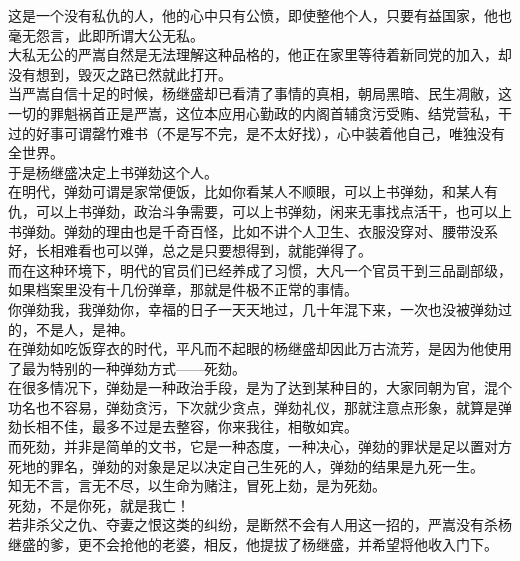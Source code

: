 \begin{multicols}{\theparacolNo}
这是一个没有私仇的人，他的心中只有公愤，即使整他个人，只要有益国家，他也毫无怨言，此即所谓大公无私。\\

大私无公的严嵩自然是无法理解这种品格的，他正在家里等待着新同党的加入，却没有想到，毁灭之路已然就此打开。\\

当严嵩自信十足的时候，杨继盛却已看清了事情的真相，朝局黑暗、民生凋敝，这一切的罪魁祸首正是严嵩，这位本应用心勤政的内阁首辅贪污受贿、结党营私，干过的好事可谓罄竹难书（不是写不完，是不太好找），心中装着他自己，唯独没有全世界。\\

于是杨继盛决定上书弹劾这个人。\\

在明代，弹劾可谓是家常便饭，比如你看某人不顺眼，可以上书弹劾，和某人有仇，可以上书弹劾，政治斗争需要，可以上书弹劾，闲来无事找点活干，也可以上书弹劾。弹劾的理由也是千奇百怪，比如不讲个人卫生、衣服没穿对、腰带没系好，长相难看也可以弹，总之是只要想得到，就能弹得了。\\

而在这种环境下，明代的官员们已经养成了习惯，大凡一个官员干到三品副部级，如果档案里没有十几份弹章，那就是件极不正常的事情。\\

你弹劾我，我弹劾你，幸福的日子一天天地过，几十年混下来，一次也没被弹劾过的，不是人，是神。\\

在弹劾如吃饭穿衣的时代，平凡而不起眼的杨继盛却因此万古流芳，是因为他使用了最为特别的一种弹劾方式——死劾。\\

在很多情况下，弹劾是一种政治手段，是为了达到某种目的，大家同朝为官，混个功名也不容易，弹劾贪污，下次就少贪点，弹劾礼仪，那就注意点形象，就算是弹劾长相不佳，最多不过是去整容，你来我往，相敬如宾。\\

而死劾，并非是简单的文书，它是一种态度，一种决心，弹劾的罪状是足以置对方死地的罪名，弹劾的对象是足以决定自己生死的人，弹劾的结果是九死一生。\\

知无不言，言无不尽，以生命为赌注，冒死上劾，是为死劾。\\

死劾，不是你死，就是我亡！\\

若非杀父之仇、夺妻之恨这类的纠纷，是断然不会有人用这一招的，严嵩没有杀杨继盛的爹，更不会抢他的老婆，相反，他提拔了杨继盛，并希望将他收入门下。\\


\end{multicols}
